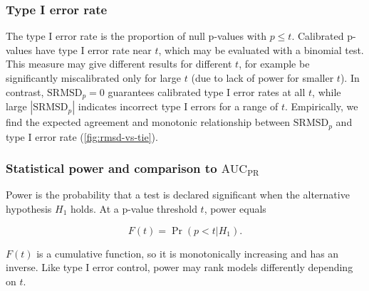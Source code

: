\documentclass[11pt]{article}
\newcommand{\rmsd}{\text{SRMSD}_p}
\newcommand{\auc}{\text{AUC}_\text{PR}}
\begin{document}
\begin{linenumbers}
\subsubsection{Type I error rate}

The type I error rate is the proportion of null p-values with $p \le t$.
Calibrated p-values have type I error rate near $t$, which may be evaluated with a binomial test.
This measure may give different results for different $t$, for example be significantly miscalibrated only for large $t$ (due to lack of power for smaller $t$).
In contrast, $\rmsd = 0$ guarantees calibrated type I error rates at all $t$, while large $|\rmsd|$ indicates incorrect type I errors for a range of $t$.
Empirically, we find the expected agreement and monotonic relationship between $\rmsd$ and type I error rate (\cref{fig:rmsd-vs-tie}).

\subsubsection{Statistical power and comparison to $\auc$}

Power is the probability that a test is declared significant when the alternative hypothesis $H_1$ holds.
At a p-value threshold $t$, power equals
\begin{linenomath*}
$$
F(t) = \Pr( p < t | H_1 ).
$$
\end{linenomath*}
$F(t)$ is a cumulative function, so it is monotonically increasing and has an inverse.
Like type I error control, power may rank models differently depending on $t$.


\end{linenumbers}
\end{document}
